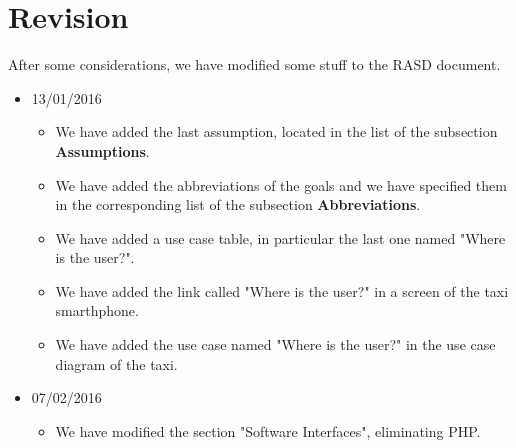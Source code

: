 \section{Revision}
After some considerations, we have modified some stuff to the RASD document.
\begin{itemize}
	\item 13/01/2016
\begin{itemize}
    \item We have added the last assumption, located in the list of the subsection \textbf{Assumptions}.
    \item We have added the abbreviations of the goals and we have specified them in the corresponding list of the subsection \textbf{Abbreviations}.
    \item We have added a use case table, in particular the last one named "Where is the user?".
    \item We have added the link called "Where is the user?" in a screen of the taxi smarthphone.
    \item We have added the use case named "Where is the user?" in the use case diagram of the taxi.
\end{itemize}
\item 07/02/2016
\begin{itemize}
	    \item We have modified the section "Software Interfaces", eliminating PHP.
\end{itemize}
\end{itemize}